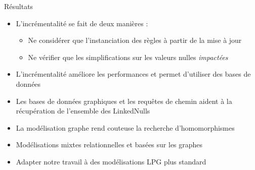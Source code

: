 \begin{frame}{Résultats}
    \begin{itemize}
        \item L'incrémentalité se fait de deux manières :
              \begin{itemize}
                  \item Ne considérer que l'instanciation des règles à partir de la mise à jour
                  \item Ne vérifier que les simplifications sur les valeurs nulles \emph{impactées}
              \end{itemize}
        \item L'incrémentalité améliore les performances et permet d'utiliser des bases de données
        \item Les bases de données graphiques et les requêtes de chemin aident à la récupération de l'ensemble des LinkedNulls
        \item La modélisation graphe rend couteuse la recherche d'homomorphismes\vfill\vline\vfill
        \item Modélisations mixtes relationnelles et basées sur les graphes \cite{hassanGRFusionGraphsFirstClass2018}
        \item Adapter notre travail à des modélisations LPG plus standard
    \end{itemize}
\end{frame}
